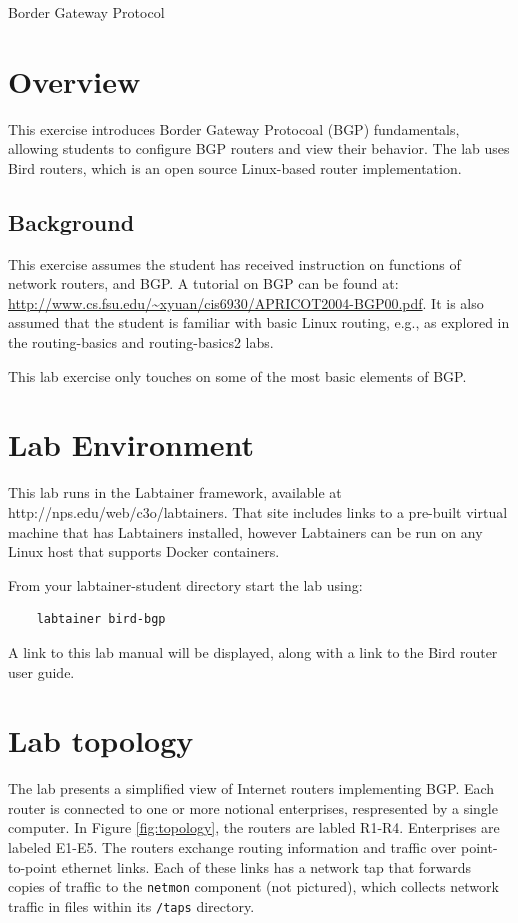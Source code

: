


\begin{center}
{\LARGE Border Gateway Protocol}
\vspace{0.1in}\\
\end{center}


\section{Overview}
This exercise introduces Border Gateway Protocoal (BGP) fundamentals,
allowing students to configure BGP routers and view their behavior.
The lab uses Bird routers, which is an open source Linux-based router
implementation.

\subsection{Background}
This exercise assumes the student has received instruction on functions
of network routers, and BGP.  A tutorial on BGP can be found at:
\url{http://www.cs.fsu.edu/~xyuan/cis6930/APRICOT2004-BGP00.pdf}.  It is also assumed
that the student is familiar with basic Linux routing, e.g., as explored in the
routing-basics and routing-basics2 labs.

This lab exercise only touches on some of the most basic elements of BGP.

\section{Lab Environment}
This lab runs in the Labtainer framework,
available at http://nps.edu/web/c3o/labtainers.
That site includes links to a pre-built virtual machine
that has Labtainers installed, however Labtainers can
be run on any Linux host that supports Docker containers.

From your labtainer-student directory start the lab using:
\begin{verbatim}
    labtainer bird-bgp
\end{verbatim}
A link to this lab manual will be displayed, along with a link to the Bird router 
user guide.

\section{Lab topology}
The lab presents a simplified view of Internet routers implementing BGP.  Each router is connected to one or more notional
enterprises, respresented by a single computer.  In Figure \ref{fig:topology}, the routers are labled R1-R4.  Enterprises
are labeled E1-E5.  The routers exchange routing information and traffic over point-to-point ethernet links.
Each of these links has a network tap that forwards copies of traffic to the {\tt netmon} component (not pictured), 
which collects network traffic in files within its {\tt /taps} directory.

